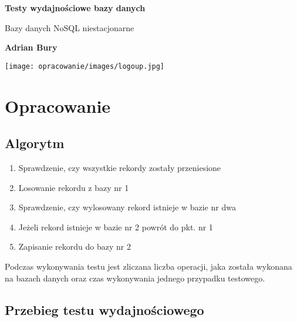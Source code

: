 \documentclass[12pt,oneside,a4paper]{book}
\begin{document}
    \begin{titlepage}

        \begin{center}
            \vspace*{1cm}

            \large{
                \textbf{Testy wydajnościowe bazy danych}
            }

            \vspace{0.5cm}
            Bazy danych NoSQL
            \linebreak
            niestacjonarne

            \vspace{1.5cm}

            \textbf{Adrian Bury}

            \vfill

            \texttt{[image: opracowanie/images/logoup.jpg]}

        \end{center}
    \end{titlepage}

    \chapter*{Opracowanie}


    \section*{Algorytm}

    \begin{enumerate}
        \item Sprawdzenie, czy wszystkie rekordy zostały przeniesione
        \item Losowanie rekordu z bazy nr 1
        \item Sprawdzenie, czy wylosowany rekord istnieje w bazie nr dwa
        \item Jeżeli rekord istnieje w bazie nr 2 powrót do pkt. nr 1
        \item Zapisanie rekordu do bazy nr 2
    \end{enumerate}

    Podczas wykonywania testu jest zliczana liczba operacji, jaka została wykonana na bazach danych
    oraz czas wykonywania jednego przypadku testowego.

    \section*{Przebieg testu wydajnościowego}
\end{document}
